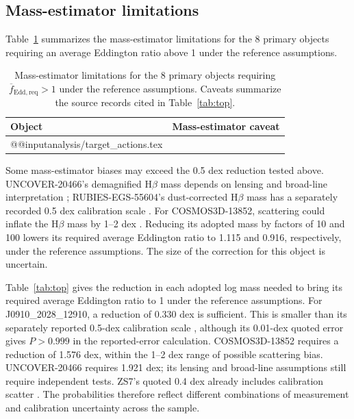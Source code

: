 \documentclass[11pt]{article}
\makeatletter
\newcommand{\tableinput}[1]{\csname @@input\endcsname #1 }
\makeatother
\begin{document}
\subsection{Mass-estimator limitations}
\label{sec:credibility}

Table~\ref{tab:actions} summarizes the mass-estimator limitations for the
8 primary objects requiring an average Eddington ratio above 1 under the
reference assumptions.

\begin{table}[htbp]
\centering\small
\caption{Mass-estimator limitations for the 8 primary objects requiring
$\overline{f}_{\mathrm{Edd,req}}>1$ under the reference assumptions.
Caveats summarize the source records cited in Table~\ref{tab:top}.}
\begin{tabular}{@{}>{\raggedright\arraybackslash}p{}>{\raggedright\arraybackslash}p{}@{}}
\toprule
Object & Mass-estimator caveat \\
\midrule
\tableinput{analysis/target_actions.tex}
\bottomrule
\end{tabular}
\label{tab:actions}
\end{table}

Some mass-estimator biases may exceed the 0.5 dex reduction tested above.
UNCOVER-20466's demagnified H$\beta$ mass depends on lensing and broad-line
interpretation \citep{greene2024}; RUBIES-EGS-55604's dust-corrected H$\beta$
mass has a separately recorded 0.5 dex calibration scale \citep{kocevski2025}.
For COSMOS3D-13852, scattering could inflate the H$\beta$ mass by 1--2 dex
\citep{lin2025}. Reducing its adopted mass by factors of 10 and 100 lowers
its required average Eddington ratio to 1.115 and 0.916, respectively, under
the reference assumptions. The size of the correction for this object is uncertain.

Table~\ref{tab:top} gives the reduction in each adopted log mass needed to
bring its required average Eddington ratio to 1 under the reference assumptions.
For J0910\_2028\_12910, a reduction of 0.330 dex is sufficient. This is
smaller than its separately reported 0.5-dex calibration scale \citep{baccus2026},
although its 0.01-dex quoted error gives $P>0.999$ in the reported-error calculation.
COSMOS3D-13852 requires a reduction of 1.576 dex, within the 1--2 dex range
of possible scattering bias. UNCOVER-20466 requires 1.921 dex; its lensing
and broad-line assumptions still require independent tests. ZS7's quoted 0.4 dex
already includes calibration scatter
\citep{ubler2024}. The probabilities therefore reflect different combinations of measurement
and calibration uncertainty across the sample.
\end{document}
